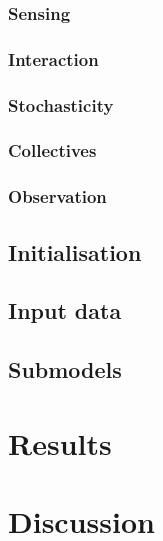 \documentclass[DIV=calc,BCOR=0mm,pagesize]{scrartcl}
\begin{document}
\subsubsection{Sensing}
\subsubsection{Interaction}
\subsubsection{Stochasticity}
\subsubsection{Collectives}
\subsubsection{Observation}

\subsection{Initialisation}
\label{ssec:modini}

\subsection{Input data}
\label{ssec:modinp}

\subsection{Submodels}
\label{ssec:modsub}

\section{Results}
\label{sec:res}

\section{Discussion}
\label{sec:dis}

\citep{wilensky_netlogo_1999}
\newpage\twocolumn\recalctypearea
\end{document}
